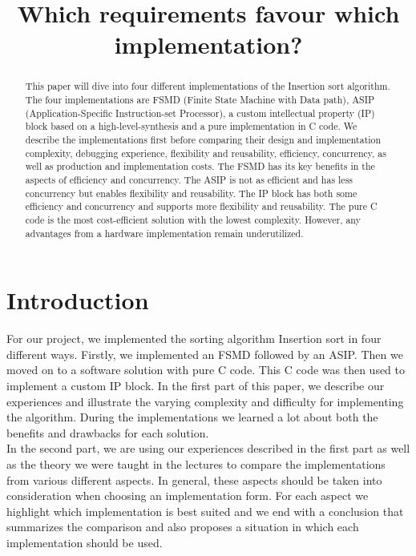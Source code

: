 \documentclass[conference]{IEEEtran}
\begin{document}
\title{Which requirements favour which implementation? \\}

\maketitle

\begin{abstract}
This paper will dive into four different implementations of the Insertion sort algorithm. The four implementations are FSMD (Finite State Machine with Data path), ASIP (Application-Specific Instruction-set Processor), a custom intellectual property (IP) block based on a high-level-synthesis and a pure implementation in C code. We describe the implementations first before comparing their design and implementation complexity, debugging experience, flexibility and reusability, efficiency, concurrency, as well as production and implementation costs. The FSMD has its key benefits in the aspects of efficiency and concurrency. The ASIP is not as efficient and has less concurrency but enables flexibility and reusability. The IP block has both some efficiency and concurrency and supports more flexibility and reusability. The pure C code is the most cost-efficient solution with the lowest complexity. However, any advantages from a hardware implementation remain underutilized.
\end{abstract}

\section{Introduction}
For our project, we implemented the sorting algorithm Insertion sort in four different ways. Firstly, we implemented an FSMD followed by an ASIP. Then we moved on to a software solution with pure C code. This C code was then used to implement a custom IP block. In the first part of this paper, we describe our experiences and illustrate the varying complexity and difficulty for implementing the algorithm. During the implementations we learned a lot about both the benefits and drawbacks for each solution.\\
In the second part, we are using our experiences described in the first part as well as the theory we were taught in the lectures to compare the implementations from various different aspects. In general, these aspects should be taken into consideration when choosing an implementation form. For each aspect we highlight which implementation is best suited and we end with a conclusion that summarizes the comparison and also proposes a situation in which each implementation should be used.
\end{document}
